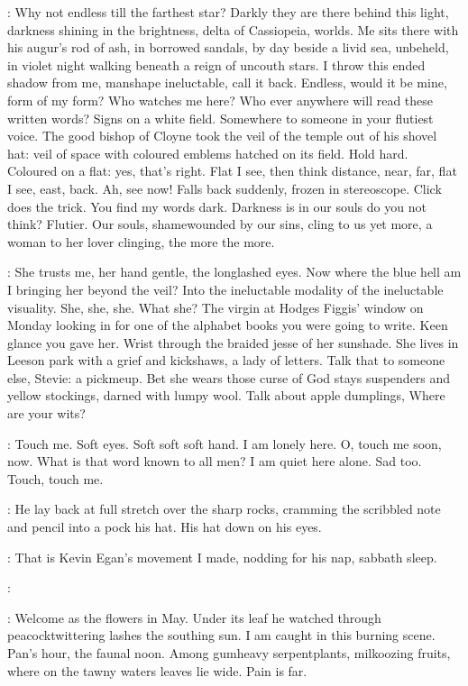 \StephenInt:
Why not endless till the farthest star?
Darkly they are there behind this light,
darkness shining in the brightness,
delta of Cassiopeia, worlds.
Me sits there with his augur's rod of ash,
in borrowed sandals,
by day beside a livid sea,
unbeheld, in violet night
walking beneath a reign of uncouth stars.
I throw this ended shadow from me, manshape ineluctable, call it back.
Endless, would it be mine, form of my form?
Who watches me here?
Who ever anywhere will read these written words?
Signs on a white field.
Somewhere to someone in your flutiest voice.
The good bishop of Cloyne took the veil of the temple
out of his shovel hat:
veil of space with coloured emblems
hatched on its field.
Hold hard.
Coloured on a flat:
yes, that's right.
Flat I see, then think distance,
near, far, flat I see, east, back.
Ah, see now!
Falls back suddenly, frozen in stereoscope.
Click does the trick.
You find my words dark.
Darkness is in our souls do you not think?
Flutier.
Our souls, shamewounded by our sins, cling to us yet more,
a woman to her lover clinging, the more the more.

\StephenInt:
She trusts me, her hand gentle, the longlashed eyes.
Now where the blue hell am I bringing her beyond the veil?
Into the ineluctable modality
of the ineluctable visuality.
She, she, she.
What she?
The virgin at Hodges Figgis' window on Monday looking in
for one of the alphabet books you were going to write.
Keen glance you gave her.
Wrist through the braided jesse of her sunshade.
She lives in Leeson park with a grief and kickshaws, a lady of letters.
Talk that to someone else,
Stevie:
a pickmeup.
Bet she wears those curse of God stays
suspenders and yellow stockings, darned with lumpy wool.
Talk about apple dumplings,
Where are your wits?

\StephenInt:
Touch me.
Soft eyes.
Soft soft soft hand.
I am lonely here.
O, touch me soon, now.
What is that word known to all men?
I am quiet here alone.
Sad too.
Touch, touch me.

:
He lay back at full stretch over the sharp rocks,
cramming the scribbled note and pencil into a pock his hat.
His hat down on his eyes.

\StephenInt:
That is Kevin Egan's movement I made,
nodding for his nap, sabbath sleep.

\kevin:

\StephenInt:
Welcome as the flowers in May.
Under its leaf he watched through peacocktwittering lashes
the southing sun.
I am caught in this burning scene.
Pan's hour, the faunal noon.
Among gumheavy serpentplants, milkoozing fruits,
where on the tawny waters leaves lie wide.
Pain is far.


